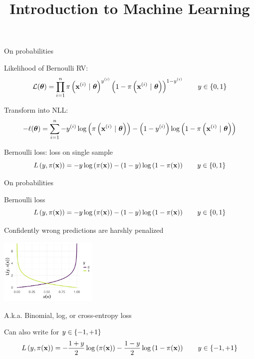 \documentclass[11pt,compress,t,notes=noshow, xcolor=table]{beamer}
\title{Introduction to Machine Learning}
\begin{document}
    

\begin{vbframe}{On probabilities}
 
\begin{itemizeL}
\item  Likelihood of Bernoulli RV:
$$
\mathcal{L}(\bm{\theta}) = \prod\limits_{i=1}^n \pi\left(\mathbf{x}^{(i)} ~|~ \bm{\theta}\right)^{y^{(i)}} \left(1-\pi\left(\mathbf{x}^{(i)} ~|~ \bm{\theta}\right)\right)^{1-y^{(i)}} \qquad  y \in \{0, 1\}
$$
\item Transform into NLL:
$$- \ell(\bm{\theta}) = \sum\limits_{i=1}^n - y^{(i)} \log\left(\pi\left(\mathbf{x}^{(i)} ~|~ \bm{\theta}\right)\right) - \left(1-y^{(i)}\right)\log\left(1-\pi\left(\mathbf{x}^{(i)} ~|~ \bm{\theta}\right)\right)$$
\item Bernoulli loss: loss on single sample
$$
L\left(y, \pi(\mathbf{x})\right) = - y \log \left(\pi(\mathbf{x})\right) - (1 - y) \log \left(1 - \pi(\mathbf{x})\right) \qquad  y \in \{0, 1\} 
$$ 
\end{itemizeL}

\end{vbframe}


\begin{vbframe}{On probabilities}
 
\begin{itemizeS}
\item Bernoulli loss
$$
L\left(y, \pi(\mathbf{x})\right) = - y \log \left(\pi(\mathbf{x})\right) - (1 - y) \log \left(1 - \pi(\mathbf{x})\right) \qquad y \in \{0, 1\} 
$$ 
\item Confidently wrong predictions are harshly penalized

\begin{center}
\includegraphics[width=0.35\textwidth]{figure/bernoulli_prob.png}  \end{center}

\item A.k.a. Binomial, log, or cross-entropy loss
\item Can also write for $y \in \{-1, +1\} $
$$
L\left(y, \pi(\mathbf{x})\right)  = - \frac{1 + y}{2} \log\left(\pi(\mathbf{x})\right) - \frac{1 - y}{2} \log\left(1 - \pi(\mathbf{x})\right) \qquad y \in \{-1, +1\} 
$$
\end{itemizeS}

\end{vbframe}
\end{document}
